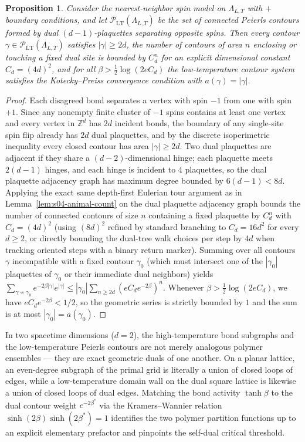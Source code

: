\documentclass[11pt]{article}
\newtheorem{proposition}[theorem]{Proposition}
\theoremstyle{definition}
\begin{document}
\begin{proposition}
\label{prop:s04-contour-weight}
Consider the nearest-neighbor spin model on $\Lambda_{L,T}$ with $+$ boundary
conditions, and let $\mathcal{P}_{\mathrm{LT}}(\Lambda_{L,T})$ be the set of
connected Peierls contours formed by dual $(d-1)$-plaquettes separating opposite
spins. Then every contour $\gamma \in \mathcal{P}_{\mathrm{LT}}(\Lambda_{L,T})$
satisfies $|\gamma| \ge 2d$, the number of contours of area $n$ enclosing or
touching a fixed dual site is bounded by $C_d^n$ for an explicit dimensional
constant $C_d = (4d)^2$, and for all $\beta > \frac{1}{2} \log(2 e C_d)$ the
low-temperature contour system satisfies the Kotecky--Preiss convergence condition
with $a(\gamma) = |\gamma|$.
\end{proposition}
\begin{proof}
Each disagreed bond separates a vertex with spin $-1$ from one with spin $+1$. Since
any nonempty finite cluster of $-1$ spins contains at least one vertex and every
vertex in $\mathbb{Z}^d$ has $2d$ incident bonds, the boundary of any single-site
spin flip already has $2d$ dual plaquettes, and by the discrete isoperimetric
inequality every closed contour has area $|\gamma| \ge 2d$. Two dual plaquettes are
adjacent if they share a $(d-2)$-dimensional hinge; each plaquette meets $2(d-1)$
hinges, and each hinge is incident to $4$ plaquettes, so the dual plaquette
adjacency graph has maximum degree bounded by $6(d-1) < 8d$. Applying the exact same
depth-first Eulerian tour argument as in Lemma~\ref{lem:s04-animal-count} on the
dual plaquette adjacency graph bounds the number of connected contours of size $n$
containing a fixed plaquette by $C_d^n$ with $C_d = (4d)^2$ (using $(8d)^{2}$
refined by standard branching to $C_d = 16 d^2$ for every $d \ge 2$, or directly
bounding the dual-tree walk choices per step by $4d$ when tracking oriented steps
with a binary return marker). Summing over all contours $\gamma$ incompatible with a
fixed contour $\gamma_0$ (which must intersect one of the $|\gamma_0|$ plaquettes of
$\gamma_0$ or their immediate dual neighbors) yields $\sum_{\gamma \not\sim
\gamma_0} e^{-2\beta |\gamma|} e^{|\gamma|} \le |\gamma_0| \sum_{n \ge 2d} (e C_d
e^{-2\beta})^n$. Whenever $\beta > \frac{1}{2} \log(2 e C_d)$, we have $e C_d
e^{-2\beta} < 1/2$, so the geometric series is strictly bounded by $1$ and the sum
is at most $|\gamma_0| = a(\gamma_0)$.
\end{proof}

In two spacetime dimensions ($d = 2$), the high-temperature bond subgraphs and the
low-temperature Peierls contours are not merely analogous polymer ensembles --- they
are exact geometric duals of one another. On a planar lattice, an even-degree
subgraph of the primal grid is literally a union of closed loops of edges, while a
low-temperature domain wall on the dual square lattice is likewise a union of closed
loops of dual edges. Matching the bond activity $\tanh \beta$ to the dual contour
weight $e^{-2\beta^*}$ via the Kramers--Wannier relation $\sinh(2\beta)
\sinh(2\beta^*) = 1$ identifies the two polymer partition functions up to an
explicit elementary prefactor and pinpoints the self-dual critical threshold.
\end{document}
